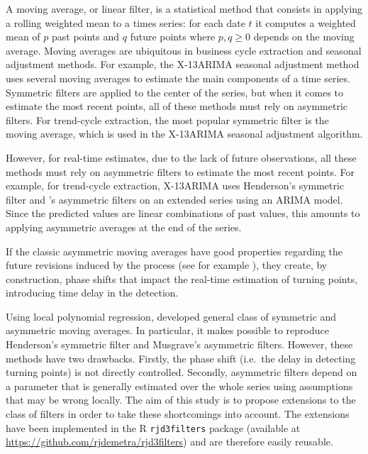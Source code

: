 \documentclass[
]{article}
\newcommand\1{\mathds{1}}
\begin{document}
A moving average, or linear filter, is a statistical method that
consists in applying a rolling weighted mean to a times series: for each
date \(t\) it computes a weighted mean of \(p\) past points and \(q\)
future points where \(p,q\geq0\) depends on the moving average. Moving
averages are ubiquitous in business cycle extraction and seasonal
adjustment methods. For example, the X-13ARIMA seasonal adjustment
method uses several moving averages to estimate the main components of a
time series. Symmetric filters are applied to the center of the series,
but when it comes to estimate the most recent points, all of these
methods must rely on asymmetric filters. For trend-cycle extraction, the
most popular symmetric filter is the \textcite{henderson1916note} moving
average, which is used in the X-13ARIMA seasonal adjustment algorithm.

However, for real-time estimates, due to the lack of future
observations, all these methods must rely on asymmetric filters to
estimate the most recent points. For example, for trend-cycle
extraction, X-13ARIMA uses Henderson's symmetric filter and
\textcite{musgrave1964set}'s asymmetric filters on an extended series
using an ARIMA model. Since the predicted values are linear combinations
of past values, this amounts to applying asymmetric averages at the end
of the series.

If the classic asymmetric moving averages have good properties regarding
the future revisions induced by the process (see for example
\textcite{pierce1980SA}), they create, by construction, phase shifts
that impact the real-time estimation of turning points, introducing time
delay in the detection.

Using local polynomial regression, \textcite{proietti2008} developed
general class of symmetric and asymmetric moving averages. In
particular, it makes possible to reproduce Henderson's symmetric filter
and Musgrave's asymmetric filters. However, these methods have two
drawbacks. Firstly, the phase shift (i.e.~the delay in detecting turning
points) is not directly controlled. Secondly, asymmetric filters depend
on a parameter that is generally estimated over the whole series using
assumptions that may be wrong locally. The aim of this study is to
propose extensions to the \textcite{proietti2008} class of filters in
order to take these shortcomings into account. The extensions have been
implemented in the R \texttt{rjd3filters} package (available at
\url{https://github.com/rjdemetra/rjd3filters}) and are therefore easily
reusable.
\end{document}
